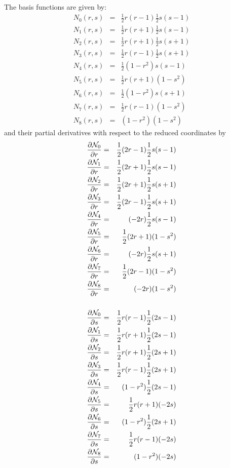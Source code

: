 The basis functions are given by:
\begin{eqnarray}
N_{0}(r,s) &=& \frac{1}{2}r(r-1)\frac12 s(s-1)\nonumber\\
N_{1}(r,s) &=& \frac{1}{2}r(r+1)\frac12 s(s-1)\nonumber\\
N_{2}(r,s) &=& \frac{1}{2}r(r+1)\frac12 s(s+1)\nonumber\\
N_{3}(r,s) &=& \frac{1}{2}r(r-1)\frac12 s(s+1)\nonumber\\
N_{4}(r,s) &=& \frac{1}{2}(1-r^2)  s(s-1)\nonumber\\
N_{5}(r,s) &=& \frac{1}{2}r(r+1)(1-s^2) \nonumber\\
N_{6}(r,s) &=& \frac{1}{2}(1-r^2)  s(s+1)\nonumber\\
N_{7}(r,s) &=& \frac{1}{2}r(r-1)(1-s^2) \nonumber\\
N_{8}(r,s) &=& (1-r^2)  (1-s^2) \nonumber
\end{eqnarray}
and their partial derivatives with respect to the reduced coordinates by
\begin{eqnarray}
\frac{\partial {\mathcal{N}}_0}{\partial r}&=& \frac{1}{2}(2r-1)  \frac{1}{2}s(s-1) \nonumber\\
\frac{\partial {\mathcal{N}}_1}{\partial r}&=& \frac{1}{2}(2r+1)  \frac{1}{2}s(s-1) \nonumber\\
\frac{\partial {\mathcal{N}}_2}{\partial r}&=& \frac{1}{2}(2r+1)  \frac{1}{2}s(s+1) \nonumber\\
\frac{\partial {\mathcal{N}}_3}{\partial r}&=& \frac{1}{2}(2r-1)  \frac{1}{2}s(s+1) \nonumber\\
\frac{\partial {\mathcal{N}}_4}{\partial r}&=&       (-2r)  \frac{1}{2}s(s-1) \nonumber\\
\frac{\partial {\mathcal{N}}_5}{\partial r}&=& \frac{1}{2}(2r+1)     (1-s^2)\nonumber\\
\frac{\partial {\mathcal{N}}_6}{\partial r}&=&       (-2r)  \frac{1}{2}s(s+1)\nonumber\\
\frac{\partial {\mathcal{N}}_7}{\partial r}&=& \frac{1}{2}(2r-1)     (1-s^2)\nonumber\\
\frac{\partial {\mathcal{N}}_8}{\partial r}&=&       (-2r)     (1-s^2)\nonumber\\ \nonumber\\
\frac{\partial {\mathcal{N}}_0}{\partial s}&=& \frac{1}{2}r(r-1)  \frac{1}{2}(2s-1)\nonumber\\
\frac{\partial {\mathcal{N}}_1}{\partial s}&=& \frac{1}{2}r(r+1)  \frac{1}{2}(2s-1)\nonumber\\
\frac{\partial {\mathcal{N}}_2}{\partial s}&=& \frac{1}{2}r(r+1)  \frac{1}{2}(2s+1)\nonumber\\
\frac{\partial {\mathcal{N}}_3}{\partial s}&=& \frac{1}{2}r(r-1)  \frac{1}{2}(2s+1)\nonumber\\
\frac{\partial {\mathcal{N}}_4}{\partial s}&=&     (1-r^2)  \frac{1}{2}(2s-1)\nonumber\\
\frac{\partial {\mathcal{N}}_5}{\partial s}&=& \frac{1}{2}r(r+1)        (-2s)\nonumber\\
\frac{\partial {\mathcal{N}}_6}{\partial s}&=&     (1-r^2)  \frac{1}{2}(2s+1)\nonumber\\
\frac{\partial {\mathcal{N}}_7}{\partial s}&=& \frac{1}{2}r(r-1)        (-2s)\nonumber\\
\frac{\partial {\mathcal{N}}_8}{\partial s}&=&     (1-r^2)        (-2s) \nonumber
\end{eqnarray}

